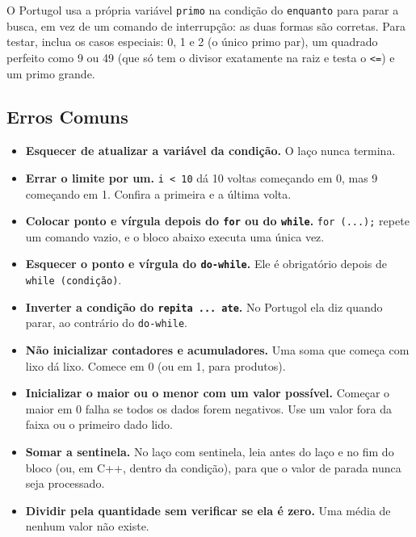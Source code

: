 O Portugol usa a própria variável \texttt{primo} na condição do \texttt{enquanto} para parar a busca, em vez de um comando de interrupção: as duas formas são corretas. Para testar, inclua os casos especiais: 0, 1 e 2 (o único primo par), um quadrado perfeito como 9 ou 49 (que só tem o divisor exatamente na raiz e testa o \texttt{<=}) e um primo grande.

\subsection{Erros Comuns}

\begin{itemize}
  \item \textbf{Esquecer de atualizar a variável da condição.} O laço nunca termina.
  \item \textbf{Errar o limite por um.} \texttt{i < 10} dá 10 voltas começando em 0, mas 9 começando em 1. Confira a primeira e a última volta.
  \item \textbf{Colocar ponto e vírgula depois do \texttt{for} ou do \texttt{while}.} \texttt{for (...);} repete um comando vazio, e o bloco abaixo executa uma única vez.
  \item \textbf{Esquecer o ponto e vírgula do \texttt{do-while}.} Ele é obrigatório depois de \texttt{while (condição)}.
  \item \textbf{Inverter a condição do \texttt{repita ... ate}.} No Portugol ela diz quando parar, ao contrário do \texttt{do-while}.
  \item \textbf{Não inicializar contadores e acumuladores.} Uma soma que começa com lixo dá lixo. Comece em 0 (ou em 1, para produtos).
  \item \textbf{Inicializar o maior ou o menor com um valor possível.} Começar o maior em 0 falha se todos os dados forem negativos. Use um valor fora da faixa ou o primeiro dado lido.
  \item \textbf{Somar a sentinela.} No laço com sentinela, leia antes do laço e no fim do bloco (ou, em C++, dentro da condição), para que o valor de parada nunca seja processado.
  \item \textbf{Dividir pela quantidade sem verificar se ela é zero.} Uma média de nenhum valor não existe.
\end{itemize}
